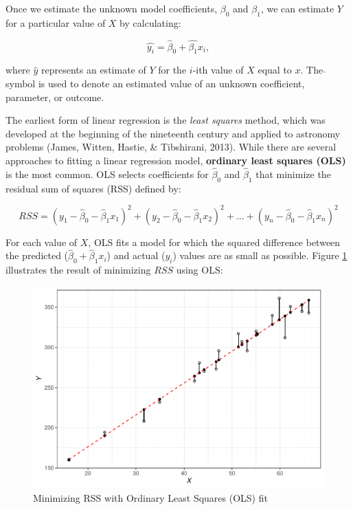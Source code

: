 \documentclass[
]{book}
\begin{document}
Once we estimate the unknown model coefficients, \(\beta_0\) and \(\beta_1\), we can estimate \(Y\) for a particular value of \(X\) by calculating:

\[ \hat{y_i} = \hat{\beta}_0 + \hat{\beta_1}x_i, \]

where \(\hat{y}\) represents an estimate of \(Y\) for the \(i\)-ith value of \(X\) equal to \(x\). The \(\hat{}\) symbol is used to denote an estimated value of an unknown coefficient, parameter, or outcome.

The earliest form of linear regression is the \emph{least squares} method, which was developed at the beginning of the nineteenth century and applied to astronomy problems (James, Witten, Hastie, \& Tibshirani, 2013). While there are several approaches to fitting a linear regression model, \textbf{ordinary least squares (OLS)} is the most common. OLS selects coefficients for \(\hat{\beta}_0\) and \(\hat{\beta}_1\) that minimize the residual sum of squares (RSS) defined by:

\[RSS = (y_1 - \hat{\beta}_0 - \hat{\beta}_1x_1)^2 + (y_2 - \hat{\beta}_0 - \hat{\beta}_1x_2)^2 + {...} + (y_n - \hat{\beta}_0 - \hat{\beta}_1x_n)^2\]

For each value of \(X\), OLS fits a model for which the squared difference between the predicted (\(\hat{\beta}_0 + \hat{\beta}_1x_i\)) and actual (\(y_i\)) values are as small as possible. Figure \ref{fig:lm-residuals} illustrates the result of minimizing \(RSS\) using OLS:

\begin{figure}

{\centering \includegraphics[width=1\linewidth]{The_Fundamentals_of_People_Analytics_files/figure-latex/lm-residuals-1} 

}

\caption{Minimizing RSS with Ordinary Least Squares (OLS) fit}\label{fig:lm-residuals}
\end{figure}
\end{document}
